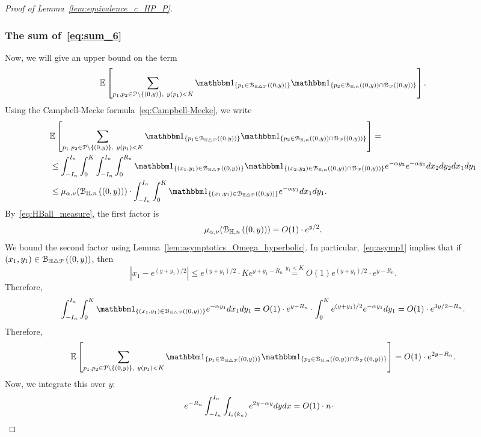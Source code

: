 \begin{proof}[Proof of Lemma~\ref{lem:equivalence_c_HP_P}]
\subsubsection{The sum of~\eqref{eq:sum_6}}
Now, we will give an upper  bound on the term
\begin{equation*}
\Exp { \sum_{p_1,p_2 \in\Pcal \setminus \{(0,y)\}, \ y(p_1) < K}
\ind{p_1\in \BallSym{(0,y)}} \ind{p_2\in \BallHyp{(0,y)}\cap \BallPo{(0,y)}}}.
\end{equation*}
Using the Campbell-Mecke formula~\eqref{eq:Campbell-Mecke}, we write 
\begin{equation*}
\begin{split}
&\Exp { \sum_{p_1,p_2 \in\Pcal \setminus \{(0,y)\}, \ y(p_1) < K}
\ind{p_1\in \BallSym{(0,y)}} \ind{p_2\in \BallHyp{(0,y)}\cap \BallPo{(0,y)}}} =\\
&\leq \int_{-I_n}^{I_n} \int_0^K \int_{-I_n}^{I_n} \int_0^{R_n} 
\ind{(x_1,y_1) \in \BallSym{(0,y)}} 
 \ind{(x_2,y_2) \in \BallHyp{(0,y)}\cap \BallPo{(0,y)}} e^{-\alpha y_2} e^{-\alpha y_1} 
 dx_2 dy_2 dx_1 dy_1 \\
 &\leq  \mu_{\alpha, \nu} (\BallHyp{(0,y)})\cdot
 \int_{-I_n}^{I_n} \int_0^K \ind{(x_1,y_1) \in \BallSym{(0,y)}} 
e^{-\alpha y_1}  dx_1 dy_1.
\end{split}
\end{equation*}
By~\eqref{eq:HBall_measure},  the first factor is 
$$ \mu_{\alpha, \nu} ({\mathcal B}_{\mathbb{H},n}\left((0,y)\right)) =O(1) \cdot e^{y/2}. $$ 
We bound the second factor using Lemma~\ref{lem:asymptotics_Omega_hyperbolic}. 
In particular,~\eqref{eq:asymp1} implies that 
if $(x_1,y_1) \in {\mathcal B}_{\mathbb{H} \bigtriangleup {\mathcal P}}\left((0,y)\right)$, then 
$$ |x_1 - e^{(y+y_1)/2} |\leq e^{(y+y_1)/2} \cdot K e^{y+y_1- R_n} \stackrel{y_1<K}{=} O(1) 
e^{(y+y_1)/2} \cdot e^{y- R_n}.$$
Therefore, 
$$ \int_{-I_n}^{I_n} \int_0^K \ind{(x_1,y_1) \in \BallSym{(0,y)}} 
e^{-\alpha y_1}  dx_1 dy_1 = O(1) \cdot e^{y-R_n} 
\cdot \int_0^K e^{(y+y_1)/2} 
e^{-\alpha y_1}   dy_1 = O(1)\cdot e^{3y/2 - R_n}. 
$$
Therefore, 
\begin{equation*}
\begin{split}
\Exp { \sum_{p_1,p_2 \in\Pcal \setminus \{(0,y)\}, \ y(p_1) < K}
\ind{p_1\in \BallSym{(0,y)}} \ind{p_2\in \BallHyp{(0,y)}\cap \BallPo{(0,y)}}} =
O(1) \cdot e^{2y - R_n}.
\end{split}
\end{equation*}
Now, we integrate this over $y$: 
\begin{equation*}
\begin{split}
&e^{-R_n} \int_{-I_n}^{I_n} \int_{I_\eps (k_n)} e^{2y -\alpha y} dy dx = O(1) \cdot n \cdot 

\end{split}
\end{equation*}
\end{proof}

